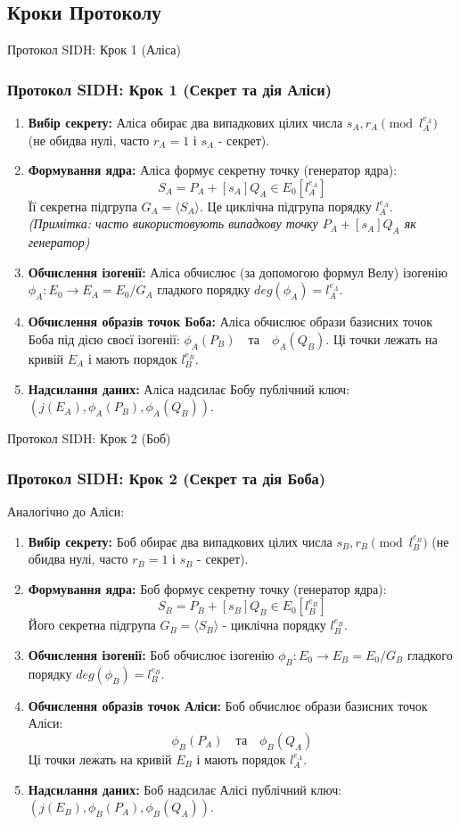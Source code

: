 \documentclass[9pt]{beamer}
\begin{document}
\begin{darkframes}
\subsection{Кроки Протоколу} %

\begin{frame}{Протокол SIDH: Крок 1 (Аліса)}
  \frametitle{Протокол SIDH: Крок 1 (Секрет та дія Аліси)}
  \begin{enumerate}
    \item \textbf{Вибір секрету:} Аліса обирає два випадкових цілих числа $s_A, r_A \pmod{l_A^{e_A}}$ (не обидва нулі, часто $r_A=1$ і $s_A$ - секрет).
    \item \textbf{Формування ядра:} Аліса формує секретну точку (генератор ядра):
      $$ S_A = P_A + [s_A] Q_A \in E_0[l_A^{e_A}] $$
      Її секретна підгрупа $G_A = \langle S_A \rangle$. Це циклічна підгрупа порядку $l_A^{e_A}$.
      \textit{(Примітка: часто використовують випадкову точку $P_A + [s_A] Q_A$ як генератор)}
    \item \textbf{Обчислення ізогенії:} Аліса обчислює (за допомогою формул Велу) ізогенію $\phi_A: E_0 \to E_A = E_0 / G_A$ гладкого порядку $deg(\phi_A)=l_A^{e_A}$.
    \item \textbf{Обчислення образів точок Боба:} Аліса обчислює образи базисних точок Боба під дією своєї ізогенії:
      $ \phi_A(P_B) \quad \text{та} \quad \phi_A(Q_B) $.
      Ці точки лежать на кривій $E_A$ і мають порядок $l_B^{e_B}$.
    \item \textbf{Надсилання даних:} Аліса надсилає Бобу публічний ключ: $(j(E_A), \phi_A(P_B), \phi_A(Q_B))$.
  \end{enumerate}
\end{frame}


\begin{frame}{Протокол SIDH: Крок 2 (Боб)}
  \frametitle{Протокол SIDH: Крок 2 (Секрет та дія Боба)}
  Аналогічно до Аліси:
  \begin{enumerate}
    \item \textbf{Вибір секрету:} Боб обирає два випадкових цілих числа $s_B, r_B \pmod{l_B^{e_B}}$ (не обидва нулі, часто $r_B=1$ і $s_B$ - секрет).
    \item \textbf{Формування ядра:} Боб формує секретну точку (генератор ядра):
      $$ S_B = P_B + [s_B] Q_B \in E_0[l_B^{e_B}] $$
      Його секретна підгрупа $G_B = \langle S_B \rangle$ - циклічна порядку $l_B^{e_B}$.
    \item \textbf{Обчислення ізогенії:} Боб обчислює ізогенію $\phi_B: E_0 \to E_B = E_0 / G_B$ гладкого порядку $deg(\phi_B)=l_B^{e_B}$.
    \item \textbf{Обчислення образів точок Аліси:} Боб обчислює образи базисних точок Аліси:
      $$ \phi_B(P_A) \quad \text{та} \quad \phi_B(Q_A) $$
      Ці точки лежать на кривій $E_B$ і мають порядок $l_A^{e_A}$.
    \item \textbf{Надсилання даних:} Боб надсилає Алісі публічний ключ: $(j(E_B), \phi_B(P_A), \phi_B(Q_A))$.
  \end{enumerate}
\end{frame}


\end{darkframes}
\end{document}
